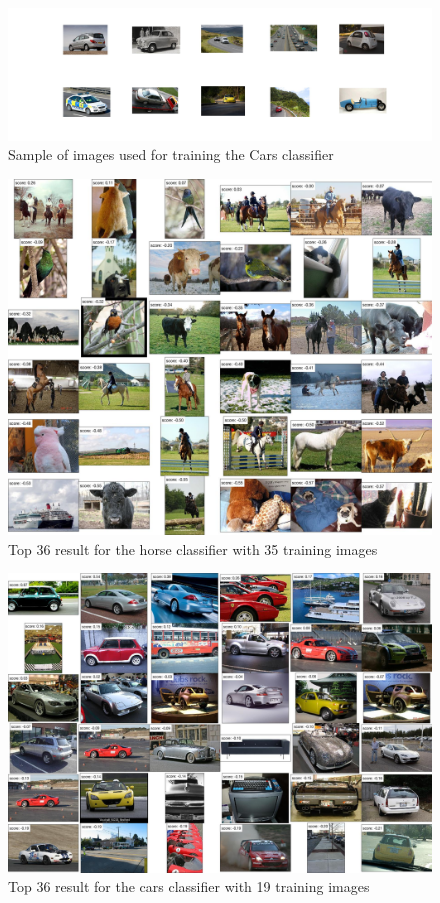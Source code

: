 \documentclass[a4paper,11pt]{exam}
\begin{document}
\begin{figure}[!h]
\centering
\includegraphics[width=17cm]{figures/sample_cars.jpg}
\caption{Sample of images used for training the Cars classifier}    
\label{sample_cars}
\end{figure}

\begin{figure}[!h]
\centering
\includegraphics[width=13cm]{figures/horse_36_35.jpg}
\caption{Top 36 result for the horse classifier with 35 training images}    
\label{horse_36_35}
\end{figure}

\begin{figure}[!h]
\centering
\includegraphics[width=13cm]{figures/cars_36_19.jpg}
\caption{Top 36 result for the cars classifier with 19 training images}    
\label{cars_36_19}
\end{figure}
\end{document}
